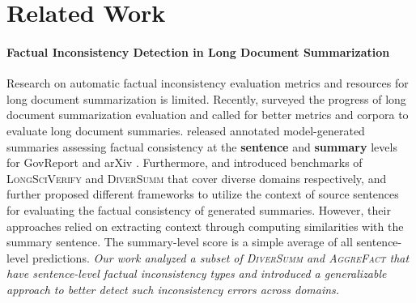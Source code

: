 \section{Related Work}

\paragraph{Factual Inconsistency Detection in Long Document Summarization}

Research on automatic factual inconsistency evaluation metrics and resources for long document summarization is limited.
Recently, \citet{Koh2022AnES} surveyed the progress of long document summarization evaluation and called for better metrics and corpora to evaluate long document summaries. \citet{koh-etal-2022-far} released annotated model-generated summaries assessing factual consistency at the
\textbf{sentence} and \textbf{summary} levels for GovReport \cite{huang-etal-2021-efficient} and arXiv \cite{cohan-etal-2018-discourse}. Furthermore, \citet{bishop-etal-2024-longdocfactscore-evaluating} and \citet{zhang-etal-2024-fine} introduced benchmarks of \textsc{LongSciVerify} and \textsc{DiverSumm} that cover diverse domains respectively, and further proposed different frameworks to utilize the context of source sentences for evaluating the factual consistency of generated summaries. However, their approaches relied on extracting context through computing similarities with the summary sentence. The summary-level score is a simple average of all sentence-level predictions. \textit{Our work analyzed a subset of \textsc{DiverSumm} and \textsc{AggreFact} \cite{tang-etal-2023-understanding} that have sentence-level factual inconsistency types and introduced a generalizable approach to better detect such inconsistency errors across domains.}






